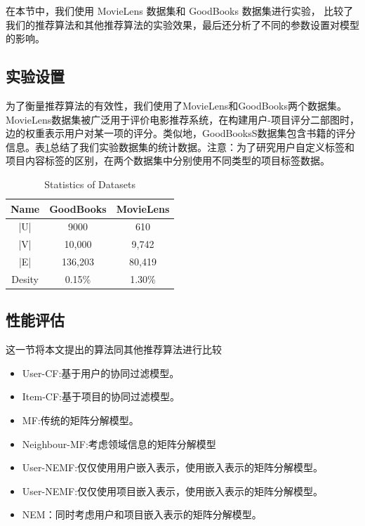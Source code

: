 \documentclass[lang=cn,11pt]{elegantpaper}
\begin{document}
在本节中，我们使用 MovieLens 数据集和 GoodBooks 数据集进行实验，
比较了我们的推荐算法和其他推荐算法的实验效果，最后还分析了不同的参数设置对模型的影响。

\subsection{实验设置}
为了衡量推荐算法的有效性，我们使用了MovieLens和GoodBooks两个数据集。MovieLens数据集被广泛用于评价电影推荐系统\cite{He2017}，在构建用户-项目评分二部图时，边的权重表示用户对某一项的评分。类似地，GoodBooksS数据集包含书籍的评分信息。表\ref{tab:set}总结了我们实验数据集的统计数据。注意：为了研究用户自定义标签和项目内容标签的区别，在两个数据集中分别使用不同类型的项目标签数据。

\begin{table}[htbp]
	\centering
	\caption{Statistics of Datasets \label{tab:set}}
	\setlength{\tabcolsep}{7mm}
	\begin{tabular}{ccc}
		\toprule
		
		Name &  GoodBooks &  MovieLens \\
		\midrule
		
		|U| &       9000 &        610 \\
		
		|V| &     10,000 &      9,742 \\
		
		|E| &    136,203 &     80,419 \\
		
		Desity &     0.15\% &     1.30\% \\
		\bottomrule
	\end{tabular}  
	
	
\end{table}
	
	
\subsection{性能评估}

这一节将本文提出的算法同其他推荐算法进行比较

\begin{itemize}
	\item User-CF:基于用户的协同过滤模型。
	\item Item-CF:基于项目的协同过滤模型。
	\item MF:传统的矩阵分解模型。
	\item Neighbour-MF:考虑领域信息的矩阵分解模型
	\item User-NEMF:仅仅使用用户嵌入表示，使用嵌入表示的矩阵分解模型。
	\item User-NEMF:仅仅使用项目嵌入表示，使用嵌入表示的矩阵分解模型。
	\item NEM：同时考虑用户和项目嵌入表示的矩阵分解模型。
\end{itemize}
\end{document}
